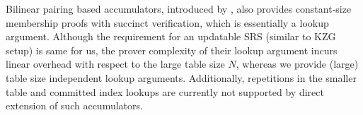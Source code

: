 Bilinear pairing based accumulators, introduced by \cite{Nguyen05}, also provides constant-size membership proofs with succinct verification, which is essentially a lookup argument. Although the requirement for an updatable SRS (similar to KZG setup) is same for us, the prover complexity of their lookup argument \cite{CCS:TBPPTD19} incurs linear overhead with respect to the large table size $N$, whereas we provide (large) table size independent lookup arguments. Additionally, repetitions in the smaller table and committed index lookups are currently not supported by direct extension of such accumulators.





